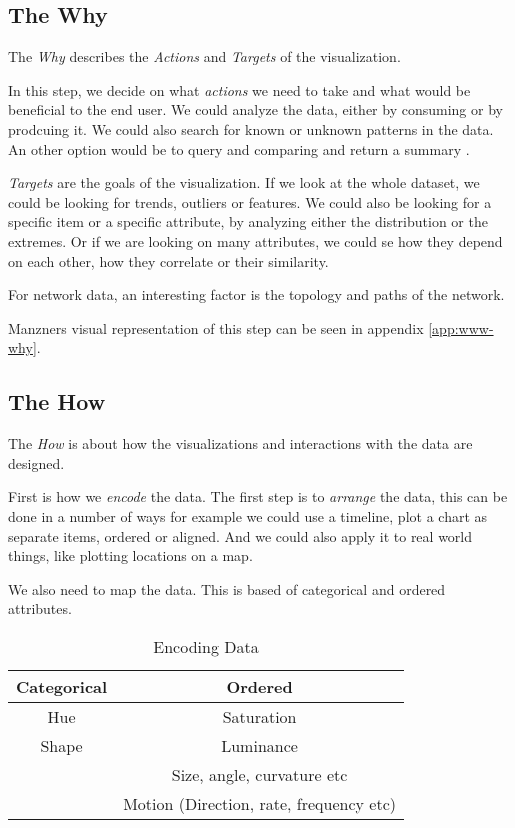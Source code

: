 \subsection{The Why}

The \textit{Why} describes the \textit{Actions} and \textit{Targets} of the visualization.

In this step, we decide on what \textit{actions} we need to take and what would be beneficial to the end user.
We could analyze the data, either by consuming or by prodcuing it. We could also search for known or unknown patterns
in the data. An other option would be to query and comparing and return a summary \cite{Munzner2015VisualizationDesign}.

\textit{Targets} are the goals of the visualization. If we look at the whole dataset, we could be looking for
trends, outliers or features. We could also be looking for a specific item or a specific attribute, by analyzing either 
the distribution or the extremes. Or if we are looking on many attributes, we could se how they depend on each other, how they
correlate or their similarity.

For network data, an interesting factor is the topology and paths of the network. 

Manzners visual representation of this step can be seen in appendix \ref{app:www-why}.

\subsection{The How}

The \textit{How} is about how the visualizations and interactions with 
the data are designed. 

First is how we \textit{encode} the data. The first step is to \textit{arrange} the data, this can be done in a number of ways for example
we could use a timeline, plot a chart as separate items, ordered or aligned. And
we could also apply it to real world things, like plotting locations on a map.

We also need to map the data. This is based of categorical and ordered attributes. 

\begin{table}[h]
    \centering

        \begin{tabular}{|c|c|}
            \hline
            \textbf{Categorical} & \textbf{Ordered} \\
            \hline
            Hue & Saturation \\
            Shape & Luminance \\
            & Size, angle, curvature etc \\
            & Motion (Direction, rate, frequency etc) \\
            \hline
        \end{tabular}

    \caption{Encoding Data}
    \label{tab:EncodingData}
\end{table}

